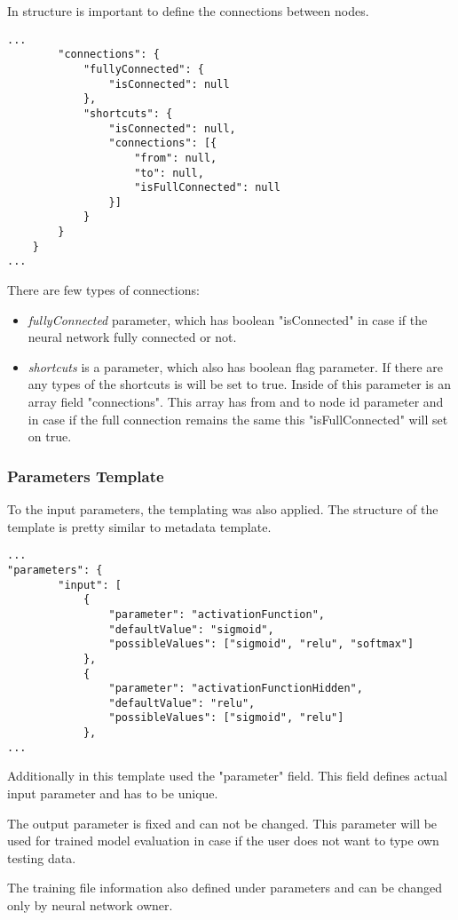  In structure is important to define the connections between nodes. 
 

 \begin{lstlisting}[caption=ViNNSL template connections]
...
		"connections": {
			"fullyConnected": {
				"isConnected": null
			},
			"shortcuts": {
				"isConnected": null,
				"connections": [{
					"from": null,
					"to": null,
					"isFullConnected": null
				}]
			}
		}
	}
...
\end{lstlisting}

There are few types of connections:
\begin{itemize}
\item \emph{fullyConnected} parameter, which has boolean "isConnected" in case if the neural network fully connected or not.
\item \emph{shortcuts} is a parameter, which also has boolean flag parameter. If there are any types of the shortcuts is will be set to true. Inside of this parameter is an array field "connections". This array has from and to node id parameter and in case if the full connection remains the same this "isFullConnected" will set on true.
\end{itemize}

\subsubsection{Parameters Template}\label{Parameters Template}

To the input parameters, the templating was also applied. The structure of the template is pretty similar to metadata template.

 \begin{lstlisting}[caption=ViNNSL template input paramteres]
...
"parameters": {
		"input": [
			{
				"parameter": "activationFunction",
				"defaultValue": "sigmoid",
				"possibleValues": ["sigmoid", "relu", "softmax"]
			},
			{
				"parameter": "activationFunctionHidden",
				"defaultValue": "relu",
				"possibleValues": ["sigmoid", "relu"]
			},
...
\end{lstlisting}

Additionally in this template used the "parameter" field. This field defines actual input parameter and has to be unique.

The output parameter is fixed and can not be changed. This parameter will be used for trained model evaluation in case if the user does not want to type own testing data.

The training file information also defined under parameters and can be changed only by neural network owner.


